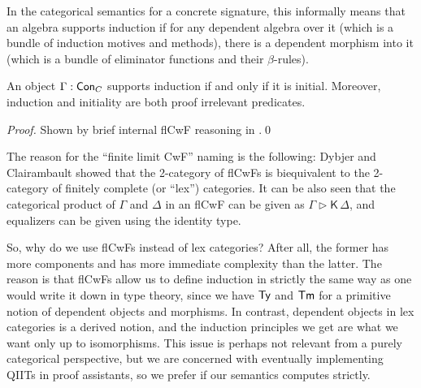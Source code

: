 \documentclass{llncs}
\newcommand{\ext}{\triangleright}
\newcommand{\Kfam}{\mathsf{K}}
\begin{document}
In the categorical semantics for a concrete signature, this informally means
that an algebra supports induction if for any dependent algebra over it (which
is a bundle of induction motives and methods), there is a dependent morphism
into it (which is a bundle of eliminator functions and their $\beta$-rules).

\begin{theorem}
An object $\Gamma : \mathsf{Con}_C$ supports induction if and only if it is
initial. Moreover, induction and initiality are both proof irrelevant
predicates.
\end{theorem}
\begin{proof} Shown by brief internal flCwF reasoning in \cite{TODO}.\qed
\end{proof}

The reason for the ``finite limit CwF'' naming is the following: Dybjer and
Clairambault showed\cite{TODO} that the 2-category of flCwFs is biequivalent to
the 2-category of finitely complete (or ``lex'') categories. It can be also seen
that the categorical product of $\Gamma$ and $\Delta$ in an flCwF can be given
as $\Gamma \ext \Kfam\, \Delta$, and equalizers can be given using the identity
type.

So, why do we use flCwFs instead of lex categories? After all, the former has
more components and has more immediate complexity than the latter. The reason is
that flCwFs allow us to define induction in strictly the same way as one would
write it down in type theory, since we have $\mathsf{Ty}$ and $\mathsf{Tm}$ for a primitive
notion of dependent objects and morphisms. In contrast, dependent objects in lex
categories is a derived notion, and the induction principles we get are what we
want only up to isomorphisms. This issue is perhaps not relevant from a purely
categorical perspective, but we are concerned with eventually implementing QIITs
in proof assistants, so we prefer if our semantics computes strictly.
\end{document}
